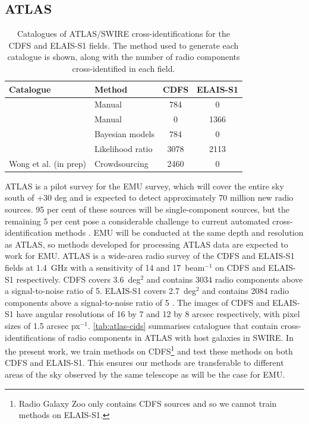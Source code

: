 \documentclass[fleqn,usenatbib,usedcolumn]{mnras}
\newcommand{\jansky}{\text{Jy}}
\newcommand{\edited}[1]{#1}
\begin{document}
  \subsection{ATLAS}\label{sec:atlas}
    \begin{table}
      \caption{Catalogues of ATLAS/SWIRE cross-identifications for the CDFS
        and ELAIS-S1 fields. The method used to generate each catalogue is
        shown, along with the number of radio components cross-identified in each
        field.}
      \label{tab:atlas-cids}
      \begin{tabular}{llcc}
        \hline
        Catalogue & Method & CDFS & ELAIS-S1\\
        \hline
        \citet{norris06} & Manual & 784 & 0\\
        \citet{middelberg08} & Manual & 0 & 1366\\
        \citet{fan15} & Bayesian models & 784 & 0\\
        \citet{weston18lrpy} & Likelihood ratio & 3078 & 2113\\
        Wong et al. (in prep) & Crowdsourcing & 2460 & 0 \\
        \hline
      \end{tabular}
    \end{table}

    ATLAS is a pilot survey for the EMU \citep{norris11} survey, which will
    cover the entire sky south of $+30$ deg and is expected to detect
    approximately 70 million new radio sources. \edited{95 per cent of these sources
    will be single-component sources, but the remaining 5 per cent pose a
    considerable challenge to current automated cross-identification methods
    \citep{norris11}.} EMU will be conducted at the same depth and resolution
    as ATLAS, so methods developed for processing ATLAS data are expected to
    work for EMU. ATLAS is a wide-area radio survey of the CDFS and ELAIS-S1
    fields at 1.4~GHz with a sensitivity of 14 and
    \unit{17}{\micro\jansky}~beam$^{-1}$ on CDFS and ELAIS-S1 respectively.
    CDFS covers 3.6~deg$^2$ and contains 3034 radio components above a
    signal-to-noise ratio of 5. ELAIS-S1 covers 2.7~deg$^2$ and contains 2084
    radio components above a signal-to-noise ratio of 5 \citep{franzen15}. The
    images of CDFS and ELAIS-S1 have angular resolutions of 16 by 7 and 12 by
    8 arcsec respectively, with pixel sizes of 1.5 arcsec px$^{-1}$.
    \autoref{tab:atlas-cids} summarises catalogues that contain
    cross-identifications of radio components in ATLAS with host galaxies in
    SWIRE. In the present work, we train methods on
    CDFS\footnote{\edited{Radio Galaxy Zoo only contains CDFS sources and so
    we cannot train methods on ELAIS-S1.}} and test these methods on both CDFS
    and ELAIS-S1. This ensures our methods are transferable to different
    areas of the sky observed by the same telescope as will be the case for
    EMU.
\end{document}
